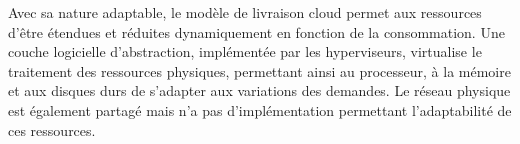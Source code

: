 Avec sa nature adaptable, le modèle de livraison cloud permet aux ressources d'être étendues et réduites  dynamiquement en fonction de la consommation. Une couche logicielle d'abstraction, implémentée par les hyperviseurs, virtualise le traitement des ressources physiques,  permettant ainsi au processeur, à la mémoire et aux disques durs de s'adapter aux variations des demandes. Le réseau physique est également partagé mais n'a pas d'implémentation permettant l'adaptabilité de ces ressources. \cite{journeySDDC} \cite{awsScaling}







